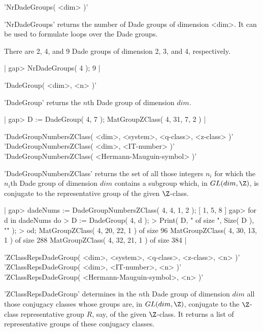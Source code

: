 \vspace{5mm}
'NrDadeGroups( <dim> )'%

'NrDadeGroups' returns the  number of Dade groups  of dimension <dim>. It
can be used to formulate loops over the Dade groups.

There are 2, 4, and 9 Dade groups of dimension 2, 3, and 4, respectively.

|    gap> NrDadeGroups( 4 );
    9 |

\vspace{5mm}
'DadeGroup( <dim>, <n> )'%

'DadeGroup' returns the $n$th Dade group of dimension $dim$.

|    gap> D := DadeGroup( 4, 7 );
    MatGroupZClass( 4, 31, 7, 2 ) |

\vspace{5mm}
'DadeGroupNumbersZClass( <dim>, <system>, <q-class>, <z-class> )'%
 \\
'DadeGroupNumbersZClass( <dim>, <IT-number> )' \\
'DadeGroupNumbersZClass( <Hermann-Mauguin-symbol> )'

'DadeGroupNumbersZClass' returns the set of  all those integers $n_i$ for
which the $n_i$th  Dade   group of dimension  $dim$ contains   a subgroup
which, in  $GL(dim,\Z)$,  is conjugate to the representative group of the
given $\Z$-class.

|    gap> dadeNums := DadeGroupNumbersZClass( 4, 4, 1, 2 );
    [ 1, 5, 8 ]
    gap> for d in dadeNums do
    >     D := DadeGroup( 4, d );
    >     Print( D, " of size ", Size( D ), "\n" );
    > od;
    MatGroupZClass( 4, 20, 22, 1 ) of size 96
    MatGroupZClass( 4, 30, 13, 1 ) of size 288
    MatGroupZClass( 4, 32, 21, 1 ) of size 384 |

\vspace{5mm}
'ZClassRepsDadeGroup( <dim>, <system>, <q-class>, <z-class>, <n> )'%
 \\
'ZClassRepsDadeGroup( <dim>, <IT-number>, <n> )' \\
'ZClassRepsDadeGroup( <Hermann-Mauguin-symbol>, <n> )'

'ZClassRepsDadeGroup' determines in  the  $n$th Dade group  of  dimension
$dim$ all  those  conjugacy classes  whose groups  are,  in $GL(dim,\Z)$,
conjugate to the $\Z$-class  representative group $R$,  say, of the given
$\Z$-class.   It  returns  a  list  of  representative  groups of   these
conjugacy classes.

